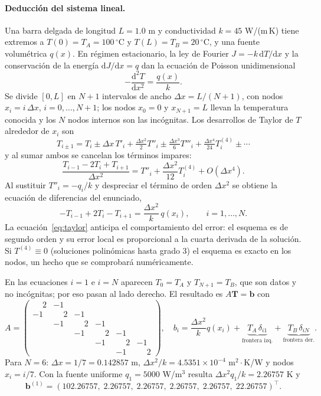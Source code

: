 \documentclass[11pt,a4paper]{article}
\newcommand{\vect}[1]{\bm{#1}}
\newcommand{\dd}{\mathrm{d}}
\begin{document}
\paragraph{Deducción del sistema lineal.}
Una barra delgada de longitud $L=1.0$ m y conductividad $k=45$ W/(m\,K) tiene extremos a $T(0)=T_A=100\,^\circ$C y $T(L)=T_B=20\,^\circ$C, y una fuente volumétrica $q(x)$. En régimen estacionario, la ley de Fourier $J=-k\,\dd T/\dd x$ y la conservación de la energía $\dd J/\dd x=q$ dan la ecuación de Poisson unidimensional
\begin{equation}
-\frac{\dd^2T}{\dd x^2}=\frac{q(x)}{k}. \label{eq:poisson}
\end{equation}
Se divide $[0,L]$ en $N+1$ intervalos de ancho $\Delta x=L/(N+1)$, con nodos $x_i=i\,\Delta x$, $i=0,\dots,N+1$; los nodos $x_0=0$ y $x_{N+1}=L$ llevan la temperatura conocida y los $N$ nodos internos son las incógnitas. Los desarrollos de Taylor de $T$ alrededor de $x_i$ son
\[
T_{i\pm1}=T_i\pm\Delta x\,T'_i+\tfrac{\Delta x^2}{2}T''_i\pm\tfrac{\Delta x^3}{6}T'''_i+\tfrac{\Delta x^4}{24}T^{(4)}_i\pm\cdots
\]
y al sumar ambos se cancelan los términos impares:
\begin{equation}
\frac{T_{i-1}-2T_i+T_{i+1}}{\Delta x^2}=T''_i+\frac{\Delta x^2}{12}T^{(4)}_i+O(\Delta x^4). \label{eq:taylor}
\end{equation}
Al sustituir $T''_i=-q_i/k$ y despreciar el término de orden $\Delta x^2$ se obtiene la ecuación de diferencias del enunciado,
\begin{equation}
-T_{i-1}+2T_i-T_{i+1}=\frac{\Delta x^2}{k}\,q(x_i),\qquad i=1,\dots,N. \label{eq:difs}
\end{equation}
La ecuación~\eqref{eq:taylor} anticipa el comportamiento del error: el esquema es de segundo orden y su error local es proporcional a la cuarta derivada de la solución. Si $T^{(4)}\equiv0$ (soluciones polinómicas hasta grado 3) el esquema es exacto en los nodos, un hecho que se comprobará numéricamente.

En las ecuaciones $i=1$ e $i=N$ aparecen $T_0=T_A$ y $T_{N+1}=T_B$, que son datos y no incógnitas; por eso pasan al lado derecho. El resultado es $A\vect T=\vect b$ con
\begin{equation}
A=\begin{pmatrix}
\phantom{-}2&-1&&&&\\-1&\phantom{-}2&-1&&&\\&-1&\phantom{-}2&-1&&\\&&-1&\phantom{-}2&-1&\\&&&-1&\phantom{-}2&-1\\&&&&-1&\phantom{-}2
\end{pmatrix},\quad
b_i=\frac{\Delta x^2}{k}q(x_i)+\underbrace{T_A\,\delta_{i1}}_{\text{frontera izq.}}+\underbrace{T_B\,\delta_{iN}}_{\text{frontera der.}}. \label{eq:sistema}
\end{equation}
Para $N=6$: $\Delta x=1/7=0.142857$ m, $\Delta x^2/k=4.5351\times10^{-4}$ m$^2\cdot$K/W y nodos $x_i=i/7$. Con la fuente uniforme $q_1=5000$ W/m$^3$ resulta $\Delta x^2q_1/k=2.26757$ K y
\[
\vect b^{(1)}=(102.26757,\;2.26757,\;2.26757,\;2.26757,\;2.26757,\;22.26757)^{\!\top}.
\]
\end{document}
